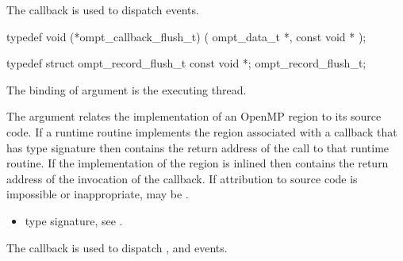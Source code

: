 \label{sec:ompt_callback_flush_t}
\summary
The  callback is used to dispatch
 events.

\format

\begin{ccppspecific}
\begin{omptCallback}
typedef void (*ompt_callback_flush_t) (
  ompt_data_t *,
  const void *
);
\end{omptCallback}
\end{ccppspecific}


\record

\begin{ccppspecific}
\begin{omptRecord}
typedef struct ompt_record_flush_t {
  const void *;
} ompt_record_flush_t;
\end{omptRecord}
\end{ccppspecific}


\argdesc

The binding of argument  is the executing thread.

The  argument relates the implementation of an OpenMP region
to its source code. If a runtime routine implements the region associated with
a callback that has type signature  then
 contains the return address of the call to that runtime routine.
If the implementation of the region is inlined then  contains the
return address of the invocation of the callback. If attribution to source code
is impossible or inappropriate, may be .

\crossreferences
\begin{itemize}
\item {} type signature, see
.
\end{itemize}



\label{sec:ompt_callback_dispatch_t}
\summary
The  callback is used to dispatch
,  and
 events.

\format

